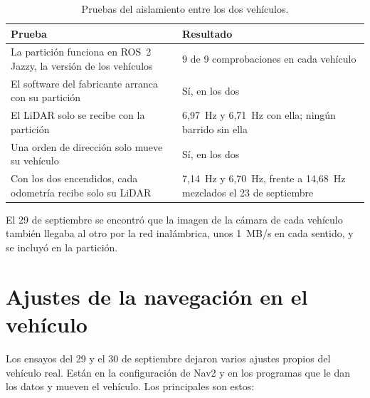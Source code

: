 \documentclass[12pt,letterpaper]{article}
\begin{document}
\begin{table}[H]
    \centering
    \small
    \caption{Pruebas del aislamiento entre los dos vehículos.}
    \label{tab:aislamiento}
    \begin{tabular}{@{}p{7.0cm}p{7.0cm}@{}}
        \toprule
        \textbf{Prueba} & \textbf{Resultado} \\ \midrule
        La partición funciona en ROS~2 Jazzy, la versión de los vehículos & 9 de 9 comprobaciones en cada vehículo \\ \addlinespace
        El software del fabricante arranca con su partición & Sí, en los dos \\ \addlinespace
        El LiDAR solo se recibe con la partición & 6,97~Hz y 6,71~Hz con ella; ningún barrido sin ella \\ \addlinespace
        Una orden de dirección solo mueve su vehículo & Sí, en los dos \\ \addlinespace
        Con los dos encendidos, cada odometría recibe solo su LiDAR & 7,14~Hz y 6,70~Hz, frente a 14,68~Hz mezclados el 23 de septiembre \\ \bottomrule
    \end{tabular}
\end{table}

El 29 de septiembre se encontró que la imagen de la cámara de cada vehículo también llegaba al otro por la red inalámbrica, unos 1~MB/s en cada sentido, y se incluyó en la partición.

\section{Ajustes de la navegación en el vehículo}
\label{sec:ajustes}

Los ensayos del 29 y el 30 de septiembre dejaron varios ajustes propios del vehículo real. Están en la configuración de Nav2 y en los programas que le dan los datos y mueven el vehículo. Los principales son estos:
\end{document}
